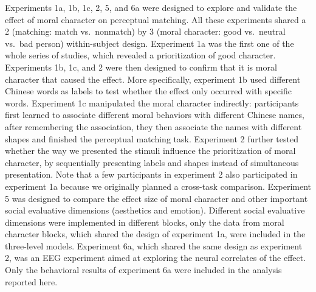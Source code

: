 \documentclass[
  man]{apa6}
\begin{document}
Experiments 1a, 1b, 1c, 2, 5, and 6a were designed to explore and validate the effect of moral character on perceptual matching. All these experiments shared a 2 (matching: match vs.~nonmatch) by 3 (moral character: good vs.~neutral vs.~bad person) within-subject design. Experiment 1a was the first one of the whole series of studies, which revealed a prioritization of good character. Experiments 1b, 1c, and 2 were then designed to confirm that it is moral character that caused the effect. More specifically, experiment 1b used different Chinese words as labels to test whether the effect only occurred with specific words. Experiment 1c manipulated the moral character indirectly: participants first learned to associate different moral behaviors with different Chinese names, after remembering the association, they then associate the names with different shapes and finished the perceptual matching task. Experiment 2 further tested whether the way we presented the stimuli influence the prioritization of moral character, by sequentially presenting labels and shapes instead of simultaneous presentation. Note that a few participants in experiment 2 also participated in experiment 1a because we originally planned a cross-task comparison. Experiment 5 was designed to compare the effect size of moral character and other important social evaluative dimensions (aesthetics and emotion). Different social evaluative dimensions were implemented in different blocks, only the data from moral character blocks, which shared the design of experiment 1a, were included in the three-level models. Experiment 6a, which shared the same design as experiment 2, was an EEG experiment aimed at exploring the neural correlates of the effect. Only the behavioral results of experiment 6a were included in the analysis reported here.
\end{document}
